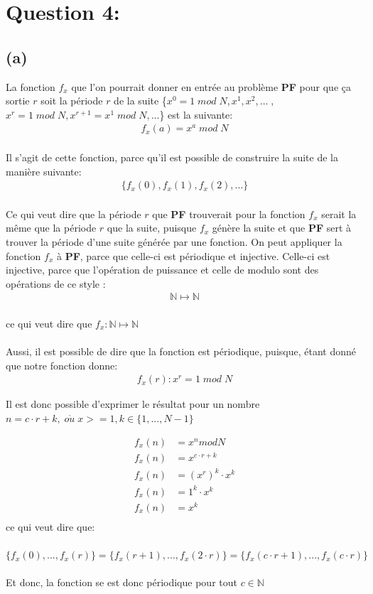 \documentclass{article}
\begin{document}
\section*{Question 4:}
\subsection*{(a)}
La fonction $f_x$ que l'on pourrait donner en entrée au problème \textbf{PF} pour que ça sortie $r$
soit la période $r$ de la suite \{$x^0 = 1\; mod\; N, x^1, x^2, ...\;,$ \\ $x^r = 1\; mod\; N, x^{r+1} = x^1\; mod\; N, ...$\} est
la suivante: \\
\begin{align*} f_x(a) = x^a\; mod\; N \end{align*} \\
Il s'agit de cette fonction, parce qu'il est possible de construire la suite de la manière suivante:
\begin{align*} \{
    f_x(0), f_x(1), f_x(2), ...
    \}
\end{align*} \\
Ce qui veut dire que la période $r$ que \textbf{PF} trouverait pour la fonction $f_x$ serait la même que
la période $r$ que la suite, puisque $f_x$ génère la suite et que \textbf{PF} sert à trouver la période d'une
suite générée par une fonction. On peut appliquer la fonction $f_x$ à \textbf{PF}, parce que celle-ci est périodique
et injective. Celle-ci est injective, parce que l'opération de puissance et celle de modulo sont des opérations de ce style :
\begin{align*} \mathbb{N} \mapsto \mathbb{N} \end{align*} \\
ce qui veut dire que $f_x:\mathbb{N}\mapsto \mathbb{N}$ \\ \\
Aussi, il est possible de dire que la fonction est périodique, puisque, étant donné que notre fonction donne:
\begin{align*} f_x(r) : x^r = 1\; mod\; N \end{align*}
\newpage
\begin{flushleft}
Il est donc possible d'exprimer le résultat pour un nombre $n = c\cdot r + k,\; o\grave{u}\; x >= 1, k \in \{1, ..., N- 1\}$
\end{flushleft}
\begin{align*}
    f_x(n) &= x^n mod N \\
    f_x(n) &= x^{c \cdot r + k} \\
    f_x(n) &= (x^r)^k\cdot x^k \\
    f_x(n) &= 1^k \cdot x^k \\
    f_x(n) &= x^k \\
\end{align*}
ce qui veut dire que: \\ \\
$\{f_x(0),...,f_x(r)\} = \{f_x(r+1), ..., f_x(2\cdot r)\} = \{f_x(c\cdot r + 1), ..., f_x(c\cdot r)\}$ \\ \\
Et donc, la fonction se est donc périodique pour tout $c \in \mathbb{N}$
\end{document}
